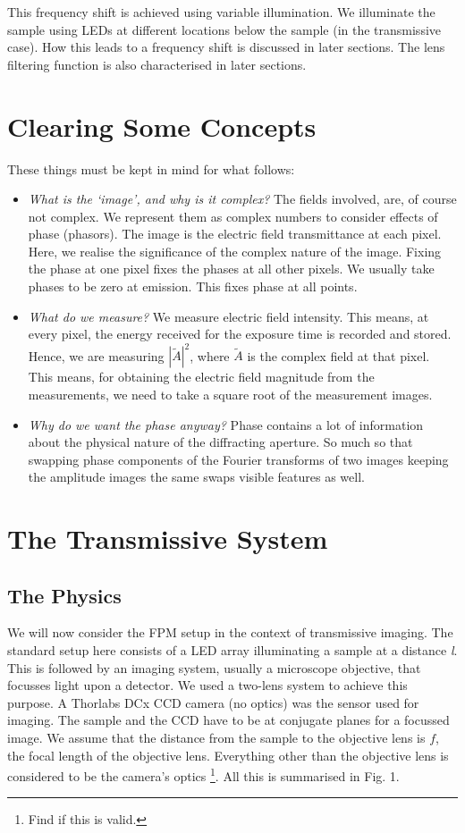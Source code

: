 \documentclass[11pt,a4paper,journal]{IEEEtran}
\begin{document}
This frequency shift is achieved using variable illumination. We illuminate the sample using LEDs at different locations below the sample (in the transmissive case). How this leads to a frequency shift is discussed in later sections. The lens filtering function is also characterised in later sections.

\section{Clearing Some Concepts}
These things must be kept in mind for what follows:
\begin{itemize}
\item \textit{What is the `image', and why is it complex?} The fields involved, are, of course not complex. We represent them as complex numbers to consider effects of phase (phasors). The image is the electric field transmittance at each pixel. Here, we realise the significance of the complex nature of the image. Fixing the phase at one pixel fixes the phases at all other pixels. We usually take phases to be zero at emission. This fixes phase at all points.
\item \textit{What do we measure?} We measure electric field intensity. This means, at every pixel, the energy received for the exposure time is recorded and stored. Hence, we are measuring $|\tilde{A}|^2$, where $\tilde{A}$ is the complex field at that pixel. This means, for obtaining the electric field magnitude from the measurements, we need to take a square root of the measurement images.
\item \textit{Why do we want the phase anyway?} Phase contains a lot of information about the physical nature of the diffracting aperture. So much so that swapping phase components of the Fourier transforms of two images keeping the amplitude images the same swaps visible features as well.
\end{itemize}

\section{The Transmissive System}

\subsection{The Physics}
We will now consider the FPM setup in the context of transmissive imaging. The standard setup here consists of a LED array illuminating a sample at a distance \textit{l}. This is followed by an imaging system, usually a microscope objective, that focusses light upon a detector. We used a two-lens system to achieve this purpose. A Thorlabs DCx CCD camera (no optics) was the sensor used for imaging. The sample and the CCD have to be at conjugate planes for a focussed image. We assume that the distance from the sample to the objective lens is $f$, the focal length of the objective lens. Everything other than the objective lens is considered to be the camera's optics \footnote{Find if this is valid.}. All this is summarised in Fig. 1.
\end{document}
